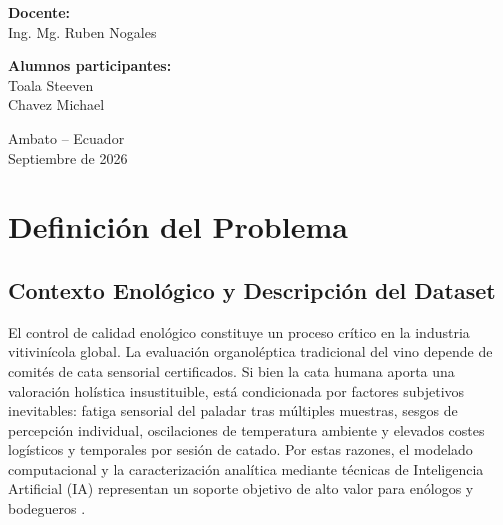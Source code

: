 \documentclass{article}
\begin{document}
\begin{titlepage}
\begin{center}
{        \textbf{Docente:}\\
        Ing. Mg. Ruben Nogales

        \vspace{0.3cm}

        \textbf{Alumnos participantes:}\\
        Toala Steeven\\
        Chavez Michael

        }

        \vfill

        {\normalsize
        Ambato -- Ecuador\\
        Septiembre de 2026
        }

    \end{center}

\end{titlepage}



\tableofcontents
\newpage

\listoffigures
\newpage

\listoftables
\newpage



\section{Definición del Problema}

\subsection{Contexto Enológico y Descripción del Dataset}

El control de calidad enológico constituye un proceso crítico en la industria vitivinícola global. La evaluación organoléptica tradicional del vino depende de comités de cata sensorial certificados. Si bien la cata humana aporta una valoración holística insustituible, está condicionada por factores subjetivos inevitables: fatiga sensorial del paladar tras múltiples muestras, sesgos de percepción individual, oscilaciones de temperatura ambiente y elevados costes logísticos y temporales por sesión de catado. Por estas razones, el modelado computacional y la caracterización analítica mediante técnicas de Inteligencia Artificial (IA) representan un soporte objetivo de alto valor para enólogos y bodegueros \cite{cortez2009modeling}.
\end{document}
